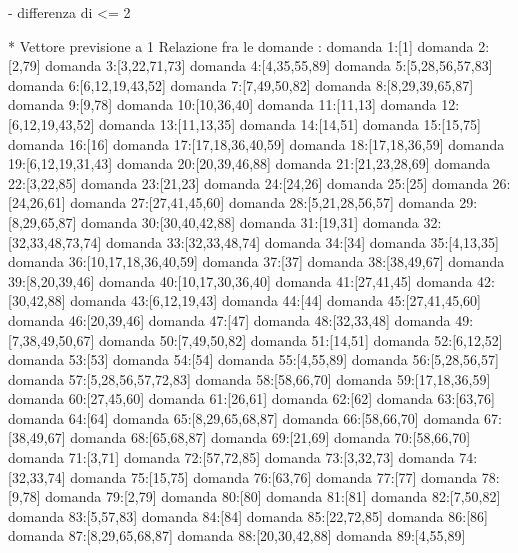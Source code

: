 - differenza di <= 2

* Vettore previsione a 1
Relazione fra le domande :
domanda 1:[1]
domanda 2:[2,79]
domanda 3:[3,22,71,73]
domanda 4:[4,35,55,89]
domanda 5:[5,28,56,57,83]
domanda 6:[6,12,19,43,52]
domanda 7:[7,49,50,82]
domanda 8:[8,29,39,65,87]
domanda 9:[9,78]
domanda 10:[10,36,40]
domanda 11:[11,13]
domanda 12:[6,12,19,43,52]
domanda 13:[11,13,35]
domanda 14:[14,51]
domanda 15:[15,75]
domanda 16:[16]
domanda 17:[17,18,36,40,59]
domanda 18:[17,18,36,59]
domanda 19:[6,12,19,31,43]
domanda 20:[20,39,46,88]
domanda 21:[21,23,28,69]
domanda 22:[3,22,85]
domanda 23:[21,23]
domanda 24:[24,26]
domanda 25:[25]
domanda 26:[24,26,61]
domanda 27:[27,41,45,60]
domanda 28:[5,21,28,56,57]
domanda 29:[8,29,65,87]
domanda 30:[30,40,42,88]
domanda 31:[19,31]
domanda 32:[32,33,48,73,74]
domanda 33:[32,33,48,74]
domanda 34:[34]
domanda 35:[4,13,35]
domanda 36:[10,17,18,36,40,59]
domanda 37:[37]
domanda 38:[38,49,67]
domanda 39:[8,20,39,46]
domanda 40:[10,17,30,36,40]
domanda 41:[27,41,45]
domanda 42:[30,42,88]
domanda 43:[6,12,19,43]
domanda 44:[44]
domanda 45:[27,41,45,60]
domanda 46:[20,39,46]
domanda 47:[47]
domanda 48:[32,33,48]
domanda 49:[7,38,49,50,67]
domanda 50:[7,49,50,82]
domanda 51:[14,51]
domanda 52:[6,12,52]
domanda 53:[53]
domanda 54:[54]
domanda 55:[4,55,89]
domanda 56:[5,28,56,57]
domanda 57:[5,28,56,57,72,83]
domanda 58:[58,66,70]
domanda 59:[17,18,36,59]
domanda 60:[27,45,60]
domanda 61:[26,61]
domanda 62:[62]
domanda 63:[63,76]
domanda 64:[64]
domanda 65:[8,29,65,68,87]
domanda 66:[58,66,70]
domanda 67:[38,49,67]
domanda 68:[65,68,87]
domanda 69:[21,69]
domanda 70:[58,66,70]
domanda 71:[3,71]
domanda 72:[57,72,85]
domanda 73:[3,32,73]
domanda 74:[32,33,74]
domanda 75:[15,75]
domanda 76:[63,76]
domanda 77:[77]
domanda 78:[9,78]
domanda 79:[2,79]
domanda 80:[80]
domanda 81:[81]
domanda 82:[7,50,82]
domanda 83:[5,57,83]
domanda 84:[84]
domanda 85:[22,72,85]
domanda 86:[86]
domanda 87:[8,29,65,68,87]
domanda 88:[20,30,42,88]
domanda 89:[4,55,89]


